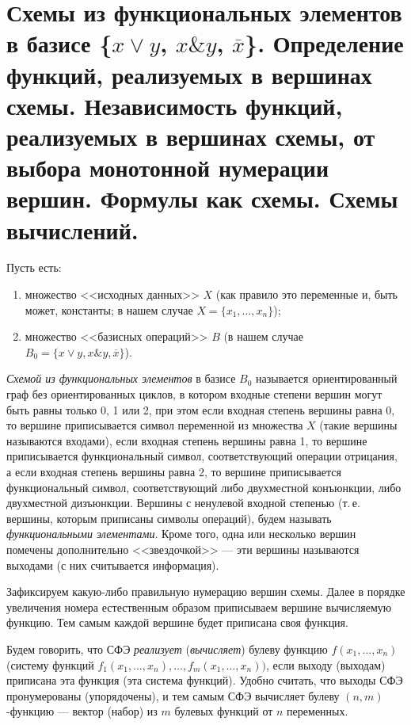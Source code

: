 \section{Схемы из функциональных элементов в базисе \{$x\vee y$, $x \& y$, $\overline{x}$\}. Определение функций, реализуемых в вершинах схемы. Независимость функций, реализуемых в вершинах схемы, от выбора монотонной нумерации вершин. Формулы как схемы. Схемы вычислений.}

Пусть есть:
\begin{enumerate}[nolistsep]
    \item множество <<исходных данных>> $X$ (как правило это переменные и, быть может, константы; в нашем случае $X = \{x_1, \ldots , x_n\}$);
    \item множество <<базисных операций>> $B$ (в нашем случае $B_0 = \{x \vee
y, x\&y, \overline{x}\}$).
\end{enumerate}

\begin{definition}
    \textit{Схемой из функциональных элементов} в базисе $B_0$ называется ориентированный граф без ориентированных циклов, в котором входные степени вершин могут быть равны только 0, 1 или 2, при этом если входная степень вершины равна 0, то вершине приписывается символ переменной из множества $X$ (такие вершины называются входами), если входная степень вершины равна 1, то вершине приписывается функциональный символ, соответствующий операции отрицания, а если входная степень вершины равна 2, то вершине приписывается функциональный символ, соответствующий либо двухместной конъюнкции, либо двухместной дизъюнкции. Вершины с ненулевой входной степенью (т.\,е. вершины, которым приписаны символы операций), будем называть \textit{функциональными элементами}. Кроме того, одна или несколько вершин помечены дополнительно <<звездочкой>> --- эти вершины называются выходами (с них считывается информация).
\end{definition}

Зафиксируем какую-либо правильную нумерацию вершин схемы. Далее в порядке увеличения номера естественным образом приписываем вершине вычисляемую функцию. Тем самым каждой вершине будет приписана своя функция.

\begin{definition}
    Будем говорить, что СФЭ \textit{реализует} (\textit{вычисляет}) булеву функцию $f(x_1, \ldots, x_n)$ (систему функций $f_1(x_1, \ldots, x_n), \ldots, f_m(x_1, \ldots, x_n))$, если выходу (выходам) приписана эта функция (эта система функций). Удобно считать, что выходы СФЭ пронумерованы (упорядочены), и тем самым СФЭ вычисляет булеву $(n, m)$-функцию --- вектор (набор) из $m$ булевых функций от $n$ переменных.

\end{definition}

